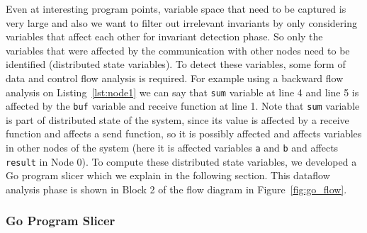 Even at interesting program points, variable space that need to be
captured is very large and also we want to filter out irrelevant invariants by only considering variables that affect each other for invariant detection phase. So only the variables that were affected by
the communication with other nodes need to be identified (distributed state variables).  To detect
these variables, some form of data and control flow analysis is required. For example using a backward flow analysis on Listing~\ref{lst:node1} we can say that \texttt{sum} variable at line 4 and line 5 is affected by the \texttt{buf} variable and receive function at line 1. Note that \texttt{sum} variable is part of distributed state of the system, since its value is affected by a receive function and affects a send function, so it is possibly affected and affects variables in other nodes of the system (here it is affected variables \texttt{a} and \texttt{b} and affects \texttt{result} in Node 0). To compute these distributed state variables, we developed a Go program slicer which we explain in the following section. This dataflow analysis phase is shown in Block 2 of the flow diagram in Figure~\ref{fig:go_flow}.

\subsubsection{Go Program Slicer}

